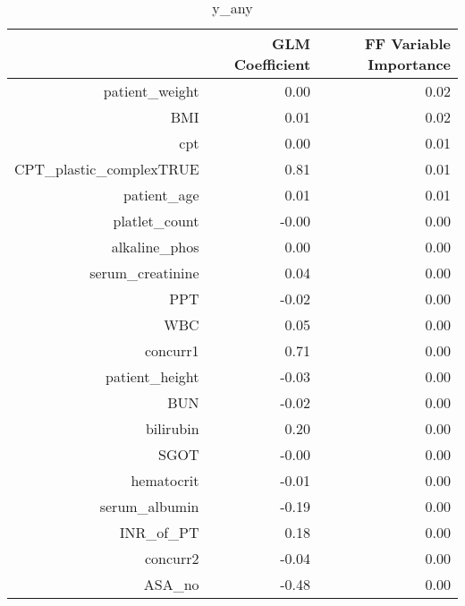 \begin{table}[ht]
\centering
\begin{tabular}{rrr}
  \hline
 & GLM Coefficient & FF Variable Importance \\ 
  \hline
patient\_weight & 0.00 & 0.02 \\ 
  BMI & 0.01 & 0.02 \\ 
  cpt & 0.00 & 0.01 \\ 
  CPT\_plastic\_complexTRUE & 0.81 & 0.01 \\ 
  patient\_age & 0.01 & 0.01 \\ 
  platlet\_count & -0.00 & 0.00 \\ 
  alkaline\_phos & 0.00 & 0.00 \\ 
  serum\_creatinine & 0.04 & 0.00 \\ 
  PPT & -0.02 & 0.00 \\ 
  WBC & 0.05 & 0.00 \\ 
  concurr1 & 0.71 & 0.00 \\ 
  patient\_height & -0.03 & 0.00 \\ 
  BUN & -0.02 & 0.00 \\ 
  bilirubin & 0.20 & 0.00 \\ 
  SGOT & -0.00 & 0.00 \\ 
  hematocrit & -0.01 & 0.00 \\ 
  serum\_albumin & -0.19 & 0.00 \\ 
  INR\_of\_PT & 0.18 & 0.00 \\ 
  concurr2 & -0.04 & 0.00 \\ 
  ASA\_no & -0.48 & 0.00 \\ 
   \hline
\end{tabular}
\caption{y_any} 
\end{table}

